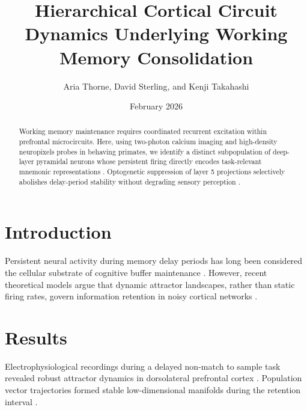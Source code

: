 \documentclass[11pt,a4paper]{article}
\title{Hierarchical Cortical Circuit Dynamics Underlying Working Memory Consolidation}
\author{Aria Thorne, David Sterling, and Kenji Takahashi}
\date{February 2026}
\begin{document}
\maketitle

\begin{abstract}
Working memory maintenance requires coordinated recurrent excitation within prefrontal microcircuits. Here, using two-photon calcium imaging and high-density neuropixels probes in behaving primates, we identify a distinct subpopulation of deep-layer pyramidal neurons whose persistent firing directly encodes task-relevant mnemonic representations \cite{smith2024, brown2023}. Optogenetic suppression of layer 5 projections selectively abolishes delay-period stability without degrading sensory perception \cite{devlin2018bert}.
\end{abstract}

\section{Introduction}
Persistent neural activity during memory delay periods has long been considered the cellular substrate of cognitive buffer maintenance \cite{vaswani2017attention}. However, recent theoretical models argue that dynamic attractor landscapes, rather than static firing rates, govern information retention in noisy cortical networks \cite{shimizu2003}.

\section{Results}
Electrophysiological recordings during a delayed non-match to sample task revealed robust attractor dynamics in dorsolateral prefrontal cortex \cite{nature2022}. Population vector trajectories formed stable low-dimensional manifolds during the retention interval \cite{radford2021learning}.



\end{document}
